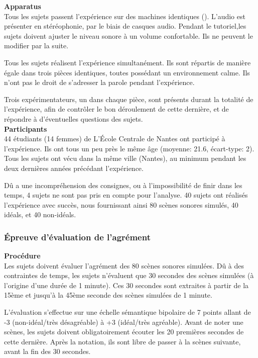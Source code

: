 \textbf{Apparatus} \\

Tous les sujets passent l'expérience sur des machines identiques (). L'audio est présenter en stéréophonie, par le biais de casques audio. Pendant le tutoriel,les sujets doivent ajuster le niveau sonore à un volume confortable. Ils ne peuvent le modifier par la suite.

Tous les sujets réalisent l'expérience simultanément. Ils sont répartis de manière égale dans trois pièces identiques, toutes possédant un environnement calme. Ils n'ont pas le droit de s'adresser la parole pendant l'expérience.

Trois expérimentateurs, un dans chaque pièce, sont présents durant la totalité de l'expérience, afin de contrôler le bon déroulement de cette dernière, et de répondre à d'éventuelles questions des sujets.  \\

\textbf{Participants} \\

44 étudiants (14 femmes) de L’École Centrale de Nantes ont participé à l'expérience. Ils ont tous un peu près le même âge (moyenne: 21.6, écart-type: 2). Tous les sujets ont vécu dans la même ville (Nantes), au minimum pendant les deux dernières années précédant l'expérience.

Dû a une incompréhension des consignes, ou à l'impossibilité de finir dans les temps, 4 sujets ne sont pas pris en compte pour l'analyse. 40 sujets ont réalisés l'expérience avec succès, nous fournissant ainsi 80 scènes sonores simulés, 40 idéals, et 40 non-idéals.

\subsubsection{Épreuve d'évaluation de l'agrément}

\textbf{Procédure} \\

Les sujets doivent évaluer l'agrément des 80 scènes sonores simulées. Dû à des contraintes de temps, les sujets n'évaluent que 30 secondes des scènes simulées (à l'origine d'une durée de 1 minute). Ces 30 secondes sont extraites à partir de la 15ème et jusqu'à la 45ème seconde des scènes simulées de 1 minute.

L'évaluation s'effectue sur une échelle sémantique bipolaire de 7 points allant de -3 (non-idéal/très désagréable) à +3 (idéal/très agréable). Avant de noter une scènes, les sujets doivent obligatoirement écouter les 20 premières secondes de cette dernière. Après la notation, ils sont libre de passer à la scènes suivante, avant la fin des 30 secondes.


